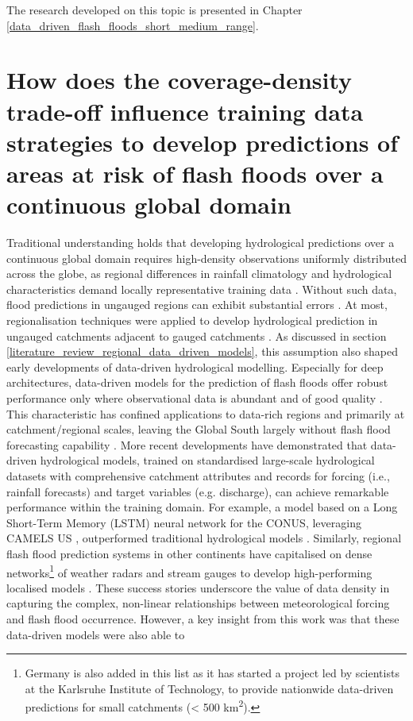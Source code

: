 The research developed on this topic is presented in Chapter \ref{data_driven_flash_floods_short_medium_range}.


\section{How does the coverage-density trade-off influence training data strategies to develop predictions of areas at risk of flash floods over a continuous global domain}
\label{literature_review_global_extension_regional_data_driven_models}

Traditional  understanding holds that developing hydrological predictions over a continuous global domain requires high-density observations uniformly distributed across the globe, as regional differences in rainfall climatology and hydrological characteristics demand locally representative training data \citep{Alfieri_2013, Hrachowitz_2013}. Without such data, flood predictions in ungauged regions can exhibit substantial errors \citep{Prakash_2025}. At most, regionalisation techniques were applied to develop hydrological prediction in ungauged catchments adjacent to gauged catchments \citep{He_2011}. As discussed in section \ref{literature_review_regional_data_driven_models}, this assumption also shaped early developments of data-driven hydrological modelling. Especially for deep architectures, data-driven models for the prediction of flash floods offer robust performance only where observational data is abundant and of good quality \citep{Zanchetta_2022, Gacu_2025}. This characteristic has confined applications to data-rich regions and primarily at catchment/regional scales, leaving the Global South largely without flash flood forecasting capability \citep{Nearing_2021}. More recent developments have demonstrated that data-driven hydrological models, trained on standardised large-scale hydrological datasets with comprehensive catchment attributes and records for forcing (i.e., rainfall forecasts) and target variables (e.g. discharge), can achieve remarkable performance within the training domain. For example, a model based on a Long Short-Term Memory (LSTM) neural network for the CONUS, leveraging CAMELS US \citep{Addor_2017}, outperformed traditional hydrological models \citep{Kratzert_2018}. Similarly, regional flash flood prediction systems in other continents have capitalised on dense networks\footnote{Germany is also added in this list as it has started a project led by scientists at the Karlsruhe Institute of Technology, to provide nationwide data-driven predictions for small catchments (< 500 km\textsuperscript{2}).} of weather radars and stream gauges to develop high-performing localised models \citep{Santos_2025}. These success stories underscore the value of data density in capturing the complex, non-linear relationships between meteorological forcing and flash flood occurrence. However, a key insight from this work was that these data-driven models were also able to 